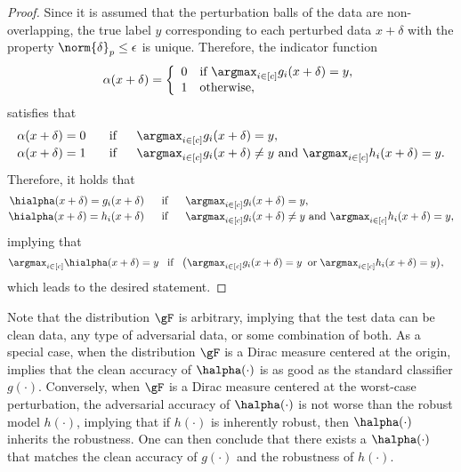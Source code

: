 \documentclass[11pt, letterpaper]{article}
\theoremstyle{plain}
\theoremstyle{definition}
\begin{document}
\begin{proof}
Since it is assumed that the perturbation balls of the data are non-overlapping, the true label $y$ corresponding to each perturbed data $x+\delta$ with the property $\norm{\delta}_p \leq \epsilon$ is unique. Therefore, the indicator function
\begin{align*}
    \alpha (x+\delta) = \bigg\{ \begin{array}{ll}
        0 & \text{if } \argmax_{i \in [c]} g_i (x+\delta) = y, \\
        1 & \text{otherwise},
    \end{array}
\end{align*}
satisfies that
\begin{align*}
    \alpha (x+\delta) = 0 \quad\;\; & \text{ if } \quad\; \argmax_{i \in [c]} g_i (x+\delta) = y, \\[-1mm]
    \alpha (x+\delta) = 1 \quad\;\; & \text{ if } \quad\; \argmax_{i \in [c]} g_i (x+\delta) \neq y \text{ and } \argmax_{i \in [c]} h_i (x+\delta) = y.
\end{align*}
Therefore, it holds that
\begin{align*}
    \hialpha (x+\delta) = g_i (x+\delta) \quad\; & \text{ if } \quad\; \argmax_{i \in [c]} g_i (x+\delta) = y, \\[-1mm]
    \hialpha (x+\delta) = h_i (x+\delta) \quad\; & \text{ if } \quad\; \argmax_{i \in [c]} g_i (x+\delta) \neq y \text{ and } \argmax_{i \in [c]} h_i (x+\delta) = y,
\end{align*}
implying that 
\begin{align*}
    & \textstyle \argmax_{i \in [c]} \hialpha (x+\delta) = y \;\;\; \text{if} \;\;\; \big( \argmax_{i \in [c]} g_i (x+\delta) = y \;\; \text{or} \; \argmax_{i \in [c]} h_i (x+\delta) = y \big),
\end{align*}
which leads to the desired statement.	
\end{proof}

Note that the distribution $\gF$ is arbitrary, implying that the test data can be clean data, any type of adversarial data, or some combination of both. As a special case, when the distribution $\gF$ is a Dirac measure centered at the origin,  implies that the clean accuracy of $\halpha (\cdot)$ is as good as the standard classifier $g (\cdot)$. Conversely, when $\gF$ is a Dirac measure centered at the worst-case perturbation, the adversarial accuracy of $\halpha (\cdot)$ is not worse than the robust model $h (\cdot)$, implying that if $h (\cdot)$ is inherently robust, then $\halpha (\cdot)$ inherits the robustness. One can then conclude that there exists a $\halpha (\cdot)$ that matches the clean accuracy of $g (\cdot)$ and the robustness of $h (\cdot)$.
\end{document}
